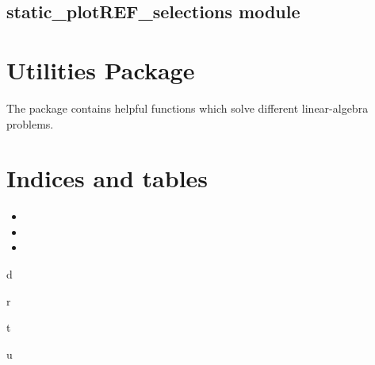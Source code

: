 \documentclass[letterpaper,10pt,english]{Reference manual}
\begin{document}
\section{static\_plotREF\_selections module}
\label{\detokenize{radarplots:static-plotref-selections-module}}

\begin{fulllineitems}
\label{\detokenize{radarplots:radar_plots.static_plotREF_selections}}
\end{fulllineitems}



\chapter{Utilities Package}
\label{\detokenize{utils::doc}}\label{\detokenize{utils:utilities-package}}
The package contains helpful functions which solve different linear-algebra problems.
\label{\detokenize{utils:module-utils}}

\chapter{Indices and tables}
\label{\detokenize{index:indices-and-tables}}\begin{itemize}
\item {} 

\item {} 

\item {} 

\end{itemize}


\renewcommand{\indexname}{Python Module Index}
\begin{sphinxtheindex}
\def\bigletter#1{{\Large\sffamily#1}\nopagebreak\vspace{1mm}}
\bigletter{d}
\item {}
\indexspace
\bigletter{r}
\item {}
\indexspace
\bigletter{t}
\item {}
\item {}
\indexspace
\bigletter{u}
\item {}
\end{sphinxtheindex}

\renewcommand{\indexname}{Index}
\printindex
\end{document}
